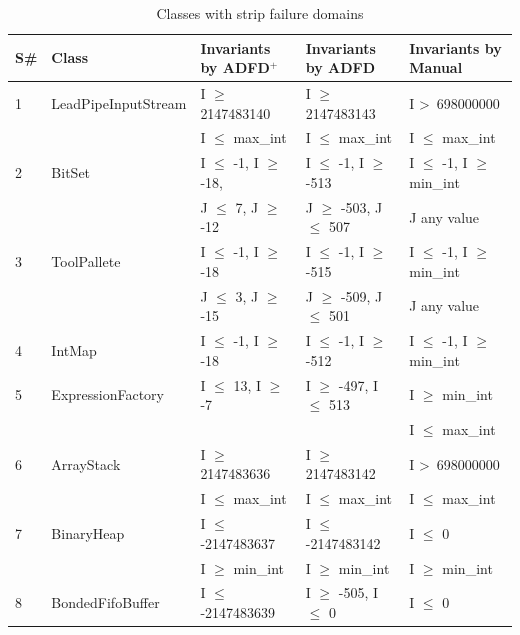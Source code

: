 \documentclass[runningheads,a4paper]{llncs}
\begin{document}
\clearpage
\newpage
{\scriptsize
\begin{longtable}{|l|l|l|l|l|}
\caption{Classes with strip failure domains}\\
\hline
S\#  & Class						& Invariants by ADFD$^+$       		& Invariants by ADFD     			& Invariants by Manual	\\
  \hline
  \endhead
1	&LeadPipeInputStream 		& I $\ge$ 2147483140			& I $\ge$ 2147483143			& I \textgreater~698000000					\\ 
	&                                             & I $\le$ max\_int			  		& I $\le$ max\_int					& I $\le$ max\_int				\\
2	& BitSet				  		& I $\le$ -1, I $\ge$ -18,			& I $\le$ -1, I $\ge$ -513			& I $\le$ -1, I $\ge$ min\_int	\\ 
	&                                             & J $\le$ 7, J $\ge$ -12  			& J $\ge$ -503, J $\le$ 507		& J any value									\\ %
3	& ToolPallete			  		& I $\le$ -1, I $\ge$ -18			& I $\le$ -1, I $\ge$ -515			& I $\le$ -1, I $\ge$ min\_int	\\ 
	&                                             & J $\le$ 3, J $\ge$ -15			& J $\ge$ -509, J $\le$ 501		& J any value			   						\\
4	& IntMap			  		& I $\le$ -1, I $\ge$ -18			& I $\le$ -1, I $\ge$ -512			& I $\le$ -1, I $\ge$ min\_int	\\
5	& ExpressionFactory	  		& I $\le$ 13, I $\ge$ -7			& I $\ge$ -497, I $\le$ 513		& I $\ge$ min\_int 				\\ %
	&                                             & 								&								& I $\le$ max\_int					\\
6	& ArrayStack					& I $\ge$ 2147483636			& I $\ge$ 2147483142			& I \textgreater~698000000 					\\ 
	&                                             & I $\le$ max\_int		 			& I $\le$ max\_int					& I $\le$ max\_int 					\\
7	& BinaryHeap				& I $\le$ -2147483637			& I $\le$ -2147483142			& I $\le$ 0								 \\	
	&                                             & I $\ge$ min\_int					& I $\ge$ min\_int				& I $\ge$ min\_int				\\
8	& BondedFifoBuffer			& I $\le$ -2147483639 			& I $\ge$ -505, I $\le$ 0			& I $\le$ 0 								\\

\end{longtable}}
\end{document}
